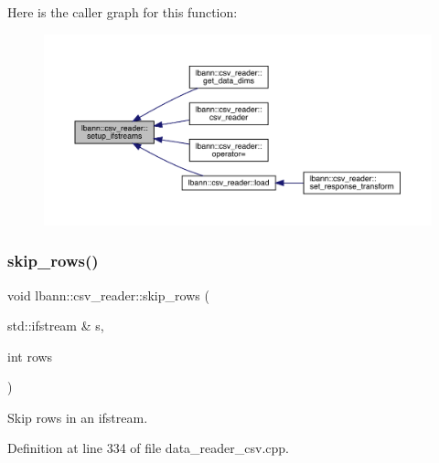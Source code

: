 Here is the caller graph for this function\+:\nopagebreak
\begin{figure}[H]
\begin{center}
\leavevmode
\includegraphics[width=350pt]{classlbann_1_1csv__reader_afc689f206192339770ee9fbd132492bb_icgraph}
\end{center}
\end{figure}
\mbox{\label{classlbann_1_1csv__reader_ace1c71ad266e6bd85573051ff45277ab}} 
\subsubsection{\texorpdfstring{skip\+\_\+rows()}{skip\_rows()}}
{\footnotesize\ttfamily void lbann\+::csv\+\_\+reader\+::skip\+\_\+rows (\begin{DoxyParamCaption}\item[{std\+::ifstream \&}]{s,  }\item[{int}]{rows }\end{DoxyParamCaption})\hspace{0.3cm}{\ttfamily [protected]}}



Skip rows in an ifstream. 



Definition at line 334 of file data\+\_\+reader\+\_\+csv.\+cpp.


